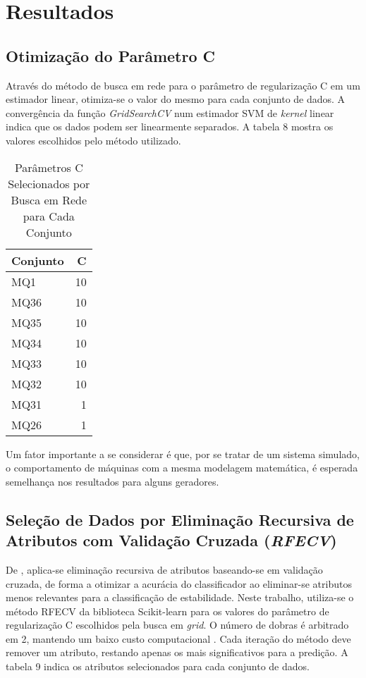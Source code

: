 \documentclass[12pt,oneside,a4paper,chapter=TITLE,section=TITLE,sumario=tradicional,english,brazil]{abntex2}
\begin{document}
\chapter{Resultados}
\section{Otimização do Parâmetro C}
Através do método de busca em rede para o parâmetro de regularização C em um estimador linear, otimiza-se o valor do mesmo para cada conjunto de dados. A convergência da função \textit{GridSearchCV} num estimador SVM de \textit{kernel} linear indica que os dados podem ser linearmente separados. A tabela 8 mostra os valores escolhidos pelo método utilizado. 
\par 

\begin{table}[h]
\centering
\caption{Parâmetros C Selecionados por Busca em Rede para Cada Conjunto}
\begin{tabular}{l|r}
\toprule
   Conjunto &  C \\
\midrule
 MQ1 & 10 \\
MQ36 & 10 \\
MQ35 & 10 \\
MQ34 & 10 \\
MQ33 & 10 \\
MQ32 & 10 \\
MQ31 &  1 \\
MQ26 &  1 \\
\bottomrule
\end{tabular}
\end{table}
\par
Um fator importante a se considerar é que, por se tratar de um sistema simulado, o comportamento de máquinas com a mesma modelagem matemática, é esperada semelhança nos resultados para alguns geradores.\par 

\section{Seleção de Dados por Eliminação Recursiva de Atributos com Validação Cruzada (\textit{RFECV})}
De \textcite{guyon2003}, aplica-se eliminação recursiva de atributos baseando-se em validação cruzada, de forma a otimizar a acurácia do classificador ao eliminar-se atributos menos relevantes para a classificação de estabilidade. Neste trabalho, utiliza-se o método RFECV da biblioteca Scikit-learn para os valores do parâmetro de regularização C escolhidos pela busca em \textit{grid}. O número de dobras é arbitrado em 2, mantendo um baixo custo computacional \cite{guyon2003}. Cada iteração do método deve remover um atributo, restando apenas os mais significativos para a predição. A tabela 9 indica os atributos selecionados para cada conjunto de dados.\par 
\end{document}
